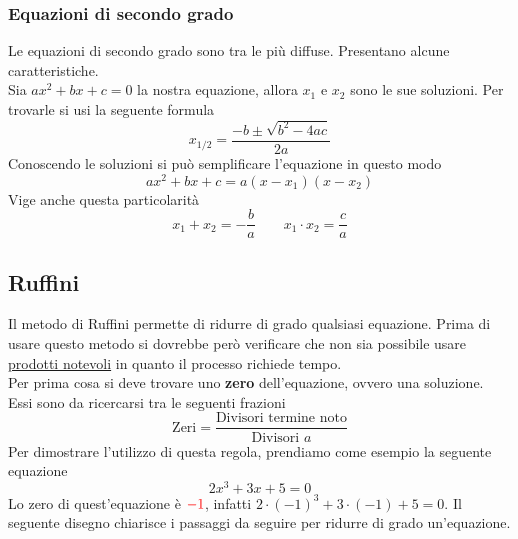 \subsubsection{Equazioni di secondo grado}
Le equazioni di secondo grado sono tra le più diffuse. Presentano alcune caratteristiche.\\
Sia $ax^2 + bx + c = 0$ la nostra equazione, allora $x_1$ e $x_2$ sono le sue soluzioni. Per trovarle
si usi la seguente formula
\begin{equation*}
  x_{1/2} = \frac{-b\pm\sqrt{b^2-4ac}}{2a}
\end{equation*}
Conoscendo le soluzioni si può semplificare l'equazione in questo modo
\begin{equation*}
  ax^2+bx+c=a(x-x_1)(x-x_2)
\end{equation*}
Vige anche questa particolarità
\begin{equation*}
  x_1+x_2 = -\frac{b}{a} \qquad x_1\cdot x_2 = \frac{c}{a}
\end{equation*}

\subsection{Ruffini}\label{ruffini}
Il metodo di Ruffini permette di ridurre di grado qualsiasi equazione. Prima di usare questo metodo si
dovrebbe però verificare che non sia possibile usare \hyperref[subsec:gen:prodnot]{prodotti notevoli}
in quanto il processo richiede tempo.\\
Per prima cosa si deve trovare uno \textbf{zero} dell'equazione, ovvero una soluzione. Essi sono
da ricercarsi tra le seguenti frazioni
\begin{equation*}
  \text{Zeri} = \frac{\text{Divisori termine noto}}{\text{Divisori $a$}}
\end{equation*}
Per dimostrare l'utilizzo di questa regola, prendiamo come esempio la seguente equazione
\begin{equation}\label{eq:ruffini}
  2x^3 + 3x + 5 = 0
\end{equation}
Lo zero di quest'equazione è $\mathcolor{red}{-1}$, infatti $2\cdot(-1)^3 + 3\cdot(-1) + 5 = 0$. Il 
seguente disegno chiarisce i passaggi da seguire per ridurre di grado un'equazione.
\begin{center}
\end{center}

